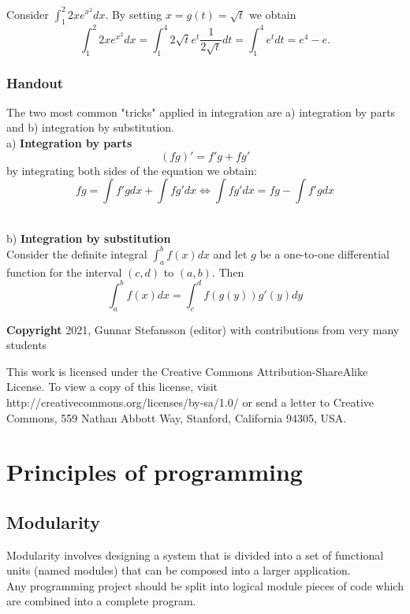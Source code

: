 \documentclass[12pt,a4paper]{article}
\theoremstyle{regla}
\theoremstyle{remark}
\theoremstyle{definition}
\theoremstyle{nonumberbreak}
\begin{document}
\begin{xmpl}
Consider $\int_1^2 2xe^{x^2} dx$. By setting $x=g(t)=\sqrt{t}$ we obtain 
$$\int_1^2 2xe^{x^2} dx = \int_1^4 2\sqrt{t}e^{t}\frac{1}{2\sqrt{t}}dt=\int_1^4 e^t dt=e^4-e.$$
\end{xmpl}
\subsubsection{Handout}
The two most common "tricks" applied in integration are a) integration by parts and b) integration by substitution.\\

a) {\bf Integration by parts}\\

$$(fg)'=f'g+fg'$$
by integrating both sides of the equation we obtain:
$$ fg=\int f'g dx + \int fg' dx \Leftrightarrow \int fg' dx=fg-\int f'g dx$$

\\

b) {\bf Integration by substitution}\\

Consider the definite integral $\int_a^b f(x) dx$ and let $g$ be a one-to-one differential function for the interval $(c,d)$ to $(a,b)$. Then
$$\int_a^b f(x) dx=\int_c^d f(g(y))g'(y) dy$$

{\bf Copyright}
2021, Gunnar Stefansson (editor) with contributions from very many students

This work is licensed under the Creative Commons
Attribution-ShareAlike License. To view a copy of this license, visit
http://creativecommons.org/licenses/by-sa/1.0/ or send a letter to
Creative Commons, 559 Nathan Abbott Way, Stanford, California 94305,
USA.
\clearpage
\section{Principles of programming}
\subsection{Modularity}
\begin{fbox}
\begin{minipage}{0.97\textwidth}
Modularity involves designing a system that is divided into a set of functional units (named modules) that can be composed into a larger application.  \\

Any programming project should be split into logical module pieces of code which are combined into a complete program.


\end{minipage}
\end{fbox}
\end{document}
